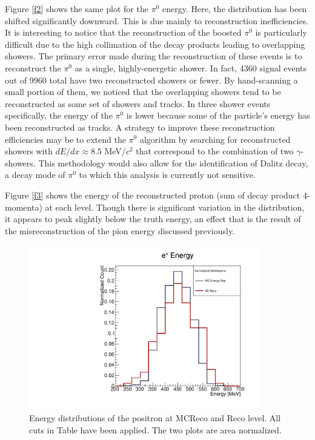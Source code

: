 \documentclass[a4paper, 10pt]{article}
\begin{document}
Figure  \ref{f2} shows the same plot for the $\pi^{0}$ energy. Here, the distribution has been shifted significantly downward. This is due mainly to reconstruction inefficiencies. It is interesting to notice that the reconstruction of the boosted $\pi^{0}$ is particularly difficult due to the high collimation of the decay products leading to overlapping showers. The primary error made during the reconstruction of these events is to reconstruct the $\pi^{0}$ as a single, highly-energetic shower.  In fact, 4360 signal events out of 9960 total have two reconstructed showers or fewer. By hand-scanning a small portion of them, we noticed that the overlapping showers tend to be reconstructed as some set of showers and tracks. In three shower events specifically, the energy of the $\pi^{0}$ is lower because some of the particle's energy has been reconstructed as tracks. A strategy to improve these reconstruction efficiencies may be to extend the $\pi^{0}$ algorithm by searching for reconstructed showers with $dE/dx \approx 8.5$ MeV/$c^2$ that correspond to the combination of two $\gamma$-showers. This methodology would also allow for the identification of Dalitz decay, a decay mode of $\pi^{0}$ to which this analysis is currently not sensitive.


Figure \ref{f3} shows the energy of the reconstructed proton (sum of decay product 4-momenta) at each level. Though there is significant variation in the distribution, it appears to peak slightly below the truth energy, an effect that is the result of the misreconstruction of the pion energy discussed previously.

\begin{figure}[p]
\begin{center}
\includegraphics[width=4in]{pPi0E/e_eplus_postcutcomp.pdf}
\caption{Energy distributions of the  positron at MCReco and Reco level. All cuts in Table \label{t3} have been applied. The two plots are area normalized.}
\label{figure1}
\end{center}
\end{figure}
\end{document}
